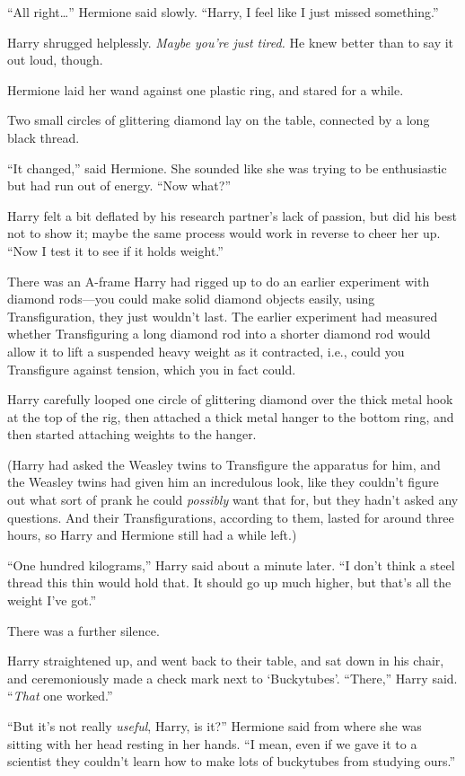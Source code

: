 “All right…” Hermione said slowly. “Harry, I feel like I just missed something.”

Harry shrugged helplessly. \emph{Maybe you’re just tired.} He knew better than to say it out loud, though.

Hermione laid her wand against one plastic ring, and stared for a while.

Two small circles of glittering diamond lay on the table, connected by a long black thread.

“It changed,” said Hermione. She sounded like she was trying to be enthusiastic but had run out of energy. “Now what?”

Harry felt a bit deflated by his research partner’s lack of passion, but did his best not to show it; maybe the same process would work in reverse to cheer her up. “Now I test it to see if it holds weight.”

There was an A-frame Harry had rigged up to do an earlier experiment with diamond rods—you could make solid diamond objects easily, using Transfiguration, they just wouldn’t last. The earlier experiment had measured whether Transfiguring a long diamond rod into a shorter diamond rod would allow it to lift a suspended heavy weight as it contracted, i.e., could you Transfigure against tension, which you in fact could.

Harry carefully looped one circle of glittering diamond over the thick metal hook at the top of the rig, then attached a thick metal hanger to the bottom ring, and then started attaching weights to the hanger.

(Harry had asked the Weasley twins to Transfigure the apparatus for him, and the Weasley twins had given him an incredulous look, like they couldn’t figure out what sort of prank he could \emph{possibly} want that for, but they hadn’t asked any questions. And their Transfigurations, according to them, lasted for around three hours, so Harry and Hermione still had a while left.)

“One hundred kilograms,” Harry said about a minute later. “I don’t think a steel thread this thin would hold that. It should go up much higher, but that’s all the weight I’ve got.”

There was a further silence.

Harry straightened up, and went back to their table, and sat down in his chair, and ceremoniously made a check mark next to ‘Buckytubes’. “There,” Harry said. “\emph{That} one worked.”

“But it’s not really \emph{useful}, Harry, is it?” Hermione said from where she was sitting with her head resting in her hands. “I mean, even if we gave it to a scientist they couldn’t learn how to make lots of buckytubes from studying ours.”

